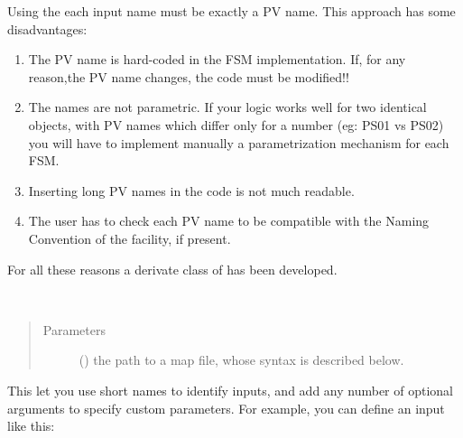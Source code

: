 \documentclass[letterpaper,10pt,english]{sphinxmanual}
\begin{document}
Using the {\hyperref[\detokenize{io:fsmIOs}]{}} each input name must be exactly a PV name. This
approach has some disadvantages:
\begin{enumerate}
\item {} 
The PV name is hard-coded in the FSM implementation. If, for any reason,the PV name changes, the code must be modified!!

\item {} 
The names are not parametric. If your logic works well for two identical objects, with PV names which differ only for a number (eg: PS01 vs PS02) you will have to implement manually a parametrization mechanism for each FSM.

\item {} 
Inserting long PV names in the code is not much readable.

\item {} 
The user has to check each PV name to be compatible with the Naming Convention of the facility, if present.

\end{enumerate}

For all these reasons a derivate class of {\hyperref[\detokenize{io:fsmIOs}]{}} has been developed.

\begin{fulllineitems}
\label{\detokenize{io:mappedIOs}}~\begin{quote}\begin{description}
\item[{Parameters}] \leavevmode
{} () \textendash{} the path to a map file, whose syntax is described below.

\end{description}\end{quote}

\end{fulllineitems}


This let you use short names to identify inputs, and add any number of optional
arguments to specify custom parameters. For example, you can define an input
like this:
\end{document}
